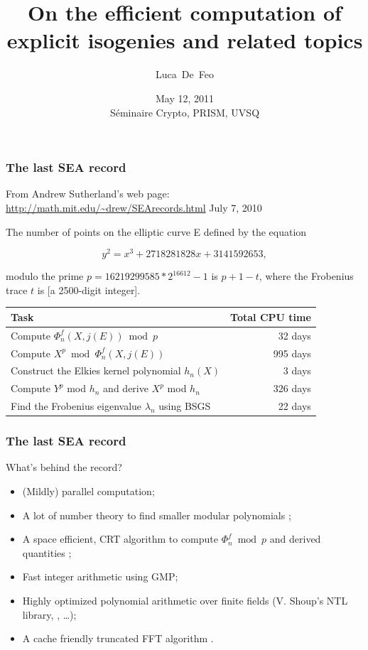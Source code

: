 \documentclass[10pt]{beamer}
\title[Explicit isogenies and related topics]{On the efficient computation of explicit isogenies and related topics}
\author{Luca~De~Feo}
\institute[IRMAR]{IRMAR, Université de Rennes 1}
\date[Versailles, May 12, 2011]{May 12, 2011\\Séminaire Crypto, PRISM, UVSQ}
\renewcommand{\emph}[1]{{\usebeamercolor[fg]{structure}#1}}
\begin{document}
\begin{frame}
  \titlepage
\end{frame}


\begin{frame}
  \frametitle{The last SEA record}

  \begin{block}{From Andrew Sutherland's web page: \url{http://math.mit.edu/~drew/SEArecords.html}}
    July 7, 2010
    
    The number of points on the elliptic curve E defined by the equation
    
    \[y^2 = x^3 + 2718281828x + 3141592653,\]
    
    modulo the prime $p=16219299585*2^{16612}-1$ is $p+1-t$, where the
    Frobenius trace $t$ is [a 2500-digit integer].
  \end{block}

  \begin{block}{}
    \centering
    \begin{tabular}{l r}
      \emph{Task} & \emph{Total CPU time}\\
      \hline
      Compute $\Phi^f_n(X,j(E)) \bmod p$ & 32 days\\
      Compute $X^p \bmod \Phi^f_n(X,j(E))$ & 995 days\\
      Construct the Elkies kernel polynomial $h_n(X)$ & 3 days\\
      Compute $Y^p$ mod $h_n$ and derive $X^p$ mod $h_n$ & 326 days\\
      Find the Frobenius eigenvalue $\lambda_n$ using BSGS & 22 days 
    \end{tabular}
  \end{block}
\end{frame}


\begin{frame}
  \frametitle{The last SEA record}

  What's behind the record?
  \begin{itemize}
    \setlength{\itemsep}{\baselineskip}
  \item (Mildly) parallel computation;
  \item A lot of number theory to find smaller modular polynomials
    \parencite{enge+sutherland10};
  \item A space efficient, CRT algorithm to compute $\Phi^f_n \bmod p$
    and derived
    quantities \parencite{fouquet+gaudry+harley00,sutherland10:modpol};
  \item Fast integer arithmetic using GMP;
  \item Highly optimized polynomial arithmetic over finite fields
    (V. Shoup's NTL library, \cite{gaudry+morain06}, \dots);
  \item A cache friendly truncated FFT algorithm \parencite{harvey+roche10}.
  \end{itemize}

\end{frame}
\end{document}
